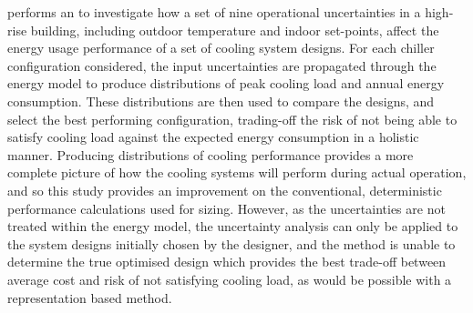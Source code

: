  performs an  to investigate how a set of nine operational uncertainties in a high-rise building, including outdoor temperature and indoor set-points, affect the energy usage performance of a set of cooling system designs. For each chiller configuration considered, the input uncertainties are propagated through the energy model to produce distributions of peak cooling load and annual energy consumption. These distributions are then used to compare the designs, and select the best performing configuration, trading-off the risk of not being able to satisfy cooling load against the expected energy consumption in a holistic manner. Producing distributions of cooling performance provides a more complete picture of how the cooling systems will perform during actual operation, and so this study provides an improvement on the conventional, deterministic performance calculations used for  sizing. However, as the uncertainties are not treated within the energy model, the uncertainty analysis can only be applied to the system designs initially chosen by the designer, and the method is unable to determine the true optimised design which provides the best trade-off between average cost and risk of not satisfying cooling load, as would be possible with a representation based method.

